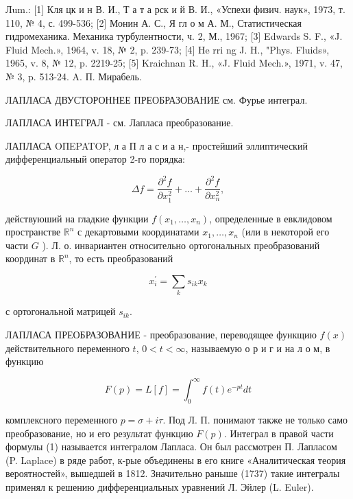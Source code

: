 \documentclass[10pt]{article}
\begin{document}
Лum.: [1] Кля цк и н В. И., Т а т а рск и й В. И., «Успехи физич. наук», 1973, т. 110, № 4, с. 499-536; [2] Монин А. С., Я гл о м А. М., Статистическая гидромеханика. Механика турбулентности, ч. 2, М., 1967; [3] Edwards S. F., «J. Fluid Mech.», 1964, v. 18, № 2, p. 239-73; [4] He rri ng J. H., "Phys. Fluids», 1965, v. 8, № 12, p. 2219-25; [5] Kraichnan R. H., «J. Fluid Mech.», 1971, v. 47, № 3, p. 513-24. A. П. Мирабель.



ЛАПЛАСА ДВУСТОРОННЕЕ ПРЕОБРАЗОВАНИЕ см. Фурье интеграл.



ЛАПЛАСА ИНТЕГРАЛ - см. Лапласа преобразование.



ЛАПЛАСА OПEPATOP, л а П л а с и а н,- простейший эллиптический дифференциальный оператор 2-го порядка:



\[

\Delta f=\frac{\partial^{2} f}{\partial x_{1}^{2}}+\ldots+\frac{\partial^{2} f}{\partial x_{n}^{2}},

\]



действуюший на гладкие функции $f\left(x_{1}, \ldots, x_{n}\right)$, определенные в евклидовом пространстве $\mathbb{R}^{n}$ с декартовыми координатами $x_{1}, \ldots, x_{n}$ (или в некоторой его части $G$ ). Л. о. инвариантен относительно ортогональных преобразований координат в $\mathbb{R}^{n}$, то есть преобразований



\[

x_{i}^{\prime}=\sum_{k} s_{i k} x_{k}

\]



с ортогональной матрицей $s_{i k}$.



ЛАПЛАСА ПРЕОБРАЗОВАНИЕ - преобразование, переводящее функщию $f(x)$ действительного переменного $t$, $0<t<\infty$, называемую о р и г и на л о м, в функцию



\[

F(p)=L[f]=\int_{0}^{\infty} f(t) e^{-p t} d t

\]



комплексного переменного $p=\sigma+i \tau$. Под Л. П. понимают также не только само преобразование, но и его результат функцию $F(p)$. Интеграл в правой части формулы (1) называется интегралом Лапласа. Он был рассмотрен П. Лапласом (P. Laplace) в ряде работ, к-рые объединены в его книге «Аналитическая теория вероятностей», вышедшей в 1812. Значительно раныше (1737) такие интегралы применял к решению дифференциальных уравнений Л. Эйлер (L. Euler).
\end{document}
